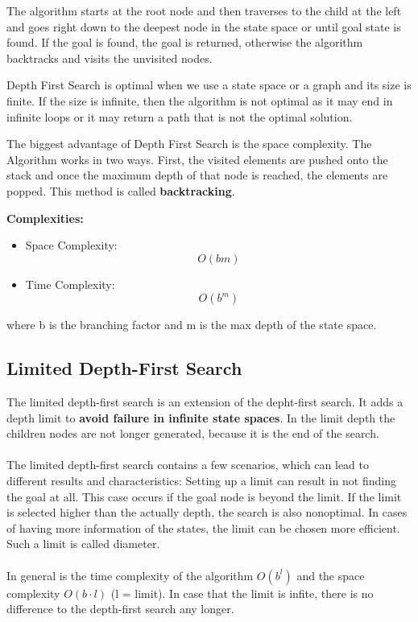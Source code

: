 \documentclass[11pt]{article}
\begin{document}
The algorithm starts at the root node and then traverses to the child at the left and goes right down to the deepest node in the state space or until goal state is found. If the goal is found, the goal is returned, otherwise the algorithm backtracks and visits the unvisited nodes. 

Depth First Search is optimal when we use a state space or a graph and its size is finite. If the size is infinite, then the algorithm is not optimal as it may end in infinite loops or it may return a path that is not the optimal solution.

The biggest advantage of Depth First Search is the space complexity.
The Algorithm works in two ways. First, the visited elements are pushed onto the stack and once the maximum depth of that node is reached, the elements are popped. This method is called \textbf{backtracking}.

\textbf{Complexities:}
\begin{itemize}
\item Space Complexity: \[O(bm)\]
\item Time Complexity: \[ O(b^m)\]
\end{itemize}

where b is the branching factor and m is the max depth of the state space.

\subsection{Limited Depth-First Search}
The limited depth-first search is an extension of the depht-first search. It adds a depth limit to \textbf{avoid failure in infinite state spaces}. In the limit depth the children nodes are not longer generated, because it is the end of the search. \\
\\
The limited depth-first search contains a few scenarios, which can lead to different results and characteristics: Setting up a limit can result in not finding the goal at all. This case occurs if the goal node is beyond the limit. If the limit is selected higher than the actually depth, the search is also nonoptimal. In cases of having more information of the states, the limit can be chosen more efficient. Such a limit is called diameter.\\
\\
In general is the time complexity of the algorithm  $O(b^{l})$ and the space complexity $O(b \cdot l)$ (l = limit). In case that the limit is infite, there is no difference to the depth-first search any longer.  
\end{document}
